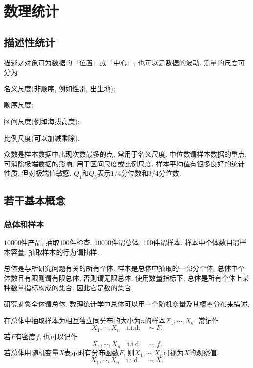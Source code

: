 \documentclass[../Statistics.tex]{subfiles}
\begin{document}
\section{数理统计} %
\label{sec:数理统计}

\subsection{描述性统计} %
\label{sub:描述性统计}

描述之对象可为数据的「位置」或「中心」, 也可以是数据的波动. 测量的尺度可分为
\begin{cenum}
    \item 名义尺度(非顺序, 例如性别, 出生地);
    \item 顺序尺度;
    \item 区间尺度(例如海拔高度);
    \item 比例尺度(可以加减乘除).
\end{cenum}
众数是样本数据中出现次数最多的点, 常用于名义尺度. 中位数谓样本数据的重点, 可消除极端数据的影响, 用于区间尺度或比例尺度. 样本平均值有很多良好的统计性质, 但对极端值敏感. $Q_1$和$Q_3$表示$1/4$分位数和$3/4$分位数.


\subsection{若干基本概念} %
\label{sub:若干基本概念}

\subsubsection{总体和样本} %
\label{ssub:总体和样本}

\begin{sample}
    \begin{ex}
        $10000$件产品, 抽取$100$件检查. $10000$件谓总体, $100$件谓样本. 样本中个体数目谓样本容量. 抽取样本的行为谓抽样.
    \end{ex}
\end{sample}
总体是与所研究问题有关的所有个体. 样本是总体中抽取的一部分个体. 总体中个体数目有限则谓有限总体, 否则谓无限总体. 使用数量指标下, 总体是所有个体上某种数量指标构成的集合. 因此它是数的集合.
\begin{definition}
    研究对象全体谓总体. 数理统计学中总体可以用一个随机变量及其概率分布来描述.
\end{definition}
在总体中抽取样本为相互独立同分布的大小为$n$的样本$X_1, \cdots, X_n$. 常记作
\[ X_1,\cdots,X_n\quad \mathrm{i.i.d.} \quad \sim F. \]
若$F$有密度$f$, 也可以记作
\[ X_1,\cdots,X_n\quad \mathrm{i.i.d.} \quad \sim f. \]
若总体用随机变量$X$表示时有分布函数$F$, 则$X_1, \cdots, X_n$可视为$X$的观察值.
\[ X_1,\cdots,X_n\quad \mathrm{i.i.d.} \quad \sim X. \]
\end{document}
